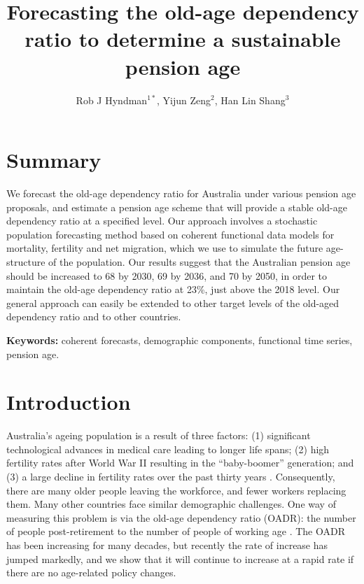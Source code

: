 \documentclass[
  doublespace]{anzsauth}
\title{Forecasting the old-age dependency ratio to determine a sustainable pension age}
\author{Rob J Hyndman\(^{1*}\), Yijun Zeng\(^2\), Han Lin Shang\(^3\)}
\date{}
\let\oldmaketitle\maketitle
\def\maketitle{\cleanlookdateon\oldmaketitle}
\begin{document}
\maketitle

\hypertarget{summary}{%
\section*{Summary}\label{summary}}

We forecast the old-age dependency ratio for Australia under various pension age proposals, and estimate a pension age scheme that will provide a stable old-age dependency ratio at a specified level. Our approach involves a stochastic population forecasting method based on coherent functional data models for mortality, fertility and net migration, which we use to simulate the future age-structure of the population. Our results suggest that the Australian pension age should be increased to 68 by 2030, 69 by 2036, and 70 by 2050, in order to maintain the old-age dependency ratio at 23\%, just above the 2018 level. Our general approach can easily be extended to other target levels of the old-aged dependency ratio and to other countries.

\textbf{Keywords:} coherent forecasts, demographic components, functional time series, pension age.

\hypertarget{introduction}{%
\section{Introduction}\label{introduction}}

Australia's ageing population is a result of three factors: (1) significant technological advances in medical care leading to longer life spans; (2) high fertility rates after World War II resulting in the ``baby-boomer'' generation; and (3) a large decline in fertility rates over the past thirty years \citep{Fehr2008}. Consequently, there are many older people leaving the workforce, and fewer workers replacing them. Many other countries face similar demographic challenges. One way of measuring this problem is via the old-age dependency ratio (OADR): the number of people post-retirement to the number of people of working age \citep{Walker1982}. The OADR has been increasing for many decades, but recently the rate of increase has jumped markedly, and we show that it will continue to increase at a rapid rate if there are no age-related policy changes.
\end{document}
